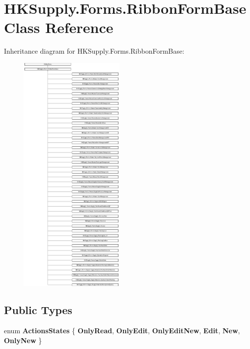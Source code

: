 \hypertarget{class_h_k_supply_1_1_forms_1_1_ribbon_form_base}{}\section{H\+K\+Supply.\+Forms.\+Ribbon\+Form\+Base Class Reference}
\label{class_h_k_supply_1_1_forms_1_1_ribbon_form_base}
Inheritance diagram for H\+K\+Supply.\+Forms.\+Ribbon\+Form\+Base\+:\begin{figure}[H]
\begin{center}
\leavevmode
\includegraphics[height=12.000000cm]{class_h_k_supply_1_1_forms_1_1_ribbon_form_base}
\end{center}
\end{figure}
\subsection*{Public Types}
\begin{DoxyCompactItemize}
\item 
\mbox{\label{class_h_k_supply_1_1_forms_1_1_ribbon_form_base_a19b5d159bbd49a901457982a3ccae61c}} 
enum {\bfseries Actions\+States} \{ \newline
{\bfseries Only\+Read}, 
{\bfseries Only\+Edit}, 
{\bfseries Only\+Edit\+New}, 
{\bfseries Edit}, 
\newline
{\bfseries New}, 
{\bfseries Only\+New}
 \}
\end{DoxyCompactItemize}
